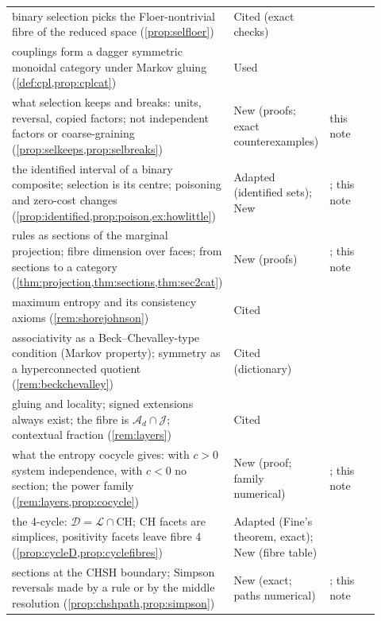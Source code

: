 \documentclass[11pt]{article}
\theoremstyle{definition}\newtheorem{definition}[theorem]{Definition}\newtheorem{remark}[theorem]{Remark}\newtheorem{example}[theorem]{Example}\newtheorem{problem}[theorem]{Open problem}\crefname{problem}{Problem}{Problems}
\begin{document}
{\begin{longtable}{p{0.46\linewidth}p{0.16\linewidth}p{0.3\linewidth}}
\rowcolor{stCited} binary selection picks the Floer-nontrivial fibre of the reduced space (\cref{prop:selfloer}) & Cited (exact checks) & \cite{ChoOh2006,AlstonAmorim2010,FOOO2010}\\
\rowcolor{stUsed} couplings form a dagger symmetric monoidal category under Markov gluing (\cref{def:cpl,prop:cplcat}) & Used & \cite{Fritz2020,ChoJacobs2019}\\
\rowcolor{stNew} what selection keeps and breaks: units, reversal, copied factors; not independent factors or coarse-graining (\cref{prop:selkeeps,prop:selbreaks}) & New (proofs; exact counterexamples) & this note\\
\rowcolor{stAdapted} the identified interval of a binary composite; selection is its centre; poisoning and zero-cost changes (\cref{prop:identified,prop:poison,ex:howlittle}) & Adapted (identified sets); New & \cite{Manski2003}; this note\\
\rowcolor{stNew} rules as sections of the marginal projection; fibre dimension over faces; from sections to a category (\cref{thm:projection,thm:sections,thm:sec2cat}) & New (proofs) & \cite{WalkupWets1969,BilleraSturmfels1992}; this note\\
\rowcolor{stCited} maximum entropy and its consistency axioms (\cref{rem:shorejohnson}) & Cited & \cite{ShoreJohnson1980,Uffink1995}\\
\rowcolor{stCited} associativity as a Beck--Chevalley-type condition (Markov property); symmetry as a hyperconnected quotient (\cref{rem:beckchevalley}) & Cited (dictionary) & \cite{Fritz2020,Hora2023}\\
\rowcolor{stCited} gluing and locality; signed extensions always exist; the fibre is $\mathcal A_d\cap\mathcal J$; contextual fraction (\cref{rem:layers}) & Cited & \cite{AbramskyBrandenburger2011,AlSafiShort2013,AbramskyBarbosaMansfield2017}\\
\rowcolor{stNew} what the entropy cocycle gives: with $c>0$ system independence, with $c<0$ no section; the power family (\cref{rem:layers,prop:cocycle}) & New (proof; family numerical) & \cite{BaudotBennequin2015,Vigneaux2020,CressieRead1984}; this note\\
\rowcolor{stAdapted} the 4-cycle: $\mathcal D=\mathcal L\cap\mathrm{CH}$; CH facets are simplices, positivity facets leave fibre 4 (\cref{prop:cycleD,prop:cyclefibres}) & Adapted (Fine's theorem, exact); New (fibre table) & \cite{Fine1982,ClauserHorne1974,AbramskyBrandenburger2011}\\
\rowcolor{stNew} sections at the CHSH boundary; Simpson reversals made by a rule or by the middle resolution (\cref{prop:chshpath,prop:simpson}) & New (exact; paths numerical) & \cite{Simpson1951}; this note\\

\end{longtable}}
\end{document}
